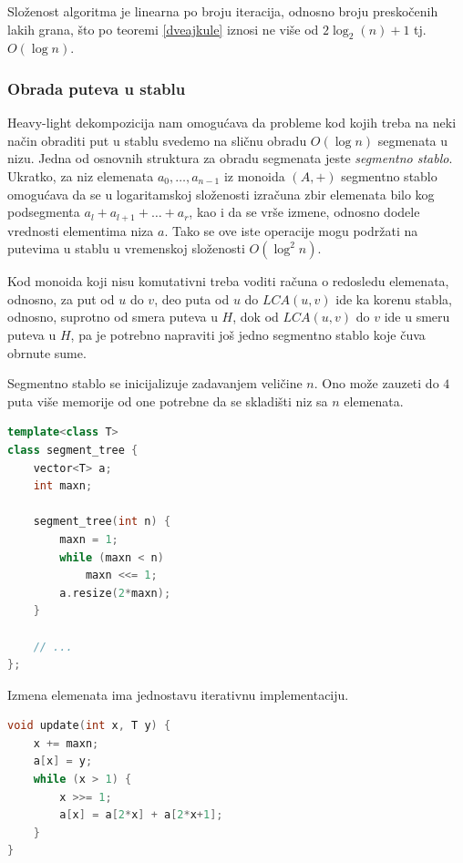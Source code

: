 Slo\v zenost algoritma je linearna po broju iteracija, odnosno broju presko\v cenih lakih grana, \v sto po teoremi \ref{dveajkule} iznosi ne vi\v se od $2\log_2(n)+1$ tj. $O(\log n)$.

\subsubsection{Obrada puteva u stablu}

Heavy-light dekompozicija nam omogu\' cava da probleme kod kojih treba na neki na\v cin obraditi put u stablu svedemo na sli\v cnu obradu $O(\log n)$ segmenata u nizu. Jedna od osnovnih struktura za obradu segmenata jeste \textit{segmentno stablo}. Ukratko, za niz elemenata $a_0, \ldots, a_{n-1}$ iz monoida $(A,+)$ segmentno stablo omogu\' cava da se u logaritamskoj slo\v zenosti izra\v cuna zbir elemenata bilo kog podsegmenta $a_l + a_{l+1} + \ldots + a_r$, kao i da se vr\v se izmene, odnosno dodele vrednosti elementima niza $a$. Tako se ove iste operacije mogu podr\v zati na putevima u stablu u vremenskoj slo\v zenosti $O(\log^2n)$.

Kod monoida koji nisu komutativni treba voditi ra\v cuna o redosledu elemenata, odnosno, za put od $u$ do $v$, deo puta od $u$ do $LCA(u,v)$ ide ka korenu stabla, odnosno, suprotno od smera puteva u $H$, dok od $LCA(u,v)$ do $v$ ide u smeru puteva u $H$, pa je potrebno napraviti jo\v s jedno segmentno stablo koje \v cuva obrnute sume.

Segmentno stablo se inicijalizuje zadavanjem veli\v cine $n$. Ono mo\v ze zauzeti do $4$ puta vi\v se memorije od one potrebne da se skladi\v sti niz sa $n$ elemenata.

\noindent
\begin{minipage}{\textwidth}
\begin{lstlisting}[language=C++, title={Inicijalizacija segmentnog stabla:}, style=customcpp]
template<class T>
class segment_tree {
	vector<T> a;
	int maxn;
	
	segment_tree(int n) {
		maxn = 1;
		while (maxn < n)
			maxn <<= 1;
		a.resize(2*maxn);
	}

	// ...
};
\end{lstlisting}
\end{minipage}

Izmena elemenata ima jednostavu iterativnu implementaciju.

\noindent
\begin{minipage}{\textwidth}
\begin{lstlisting}[language=C++, title={Izmena elementa u segmentnom stablu:}, style=customcpp]
void update(int x, T y) {
	x += maxn;
	a[x] = y;
	while (x > 1) {
		x >>= 1;
		a[x] = a[2*x] + a[2*x+1];
	}
}
\end{lstlisting}
\end{minipage}

